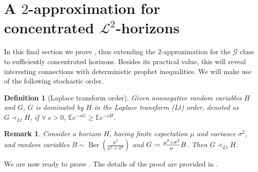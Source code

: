 \documentclass[11pt, a4paper, twoside]{article}
\newcommand*{\defeq}{\mathrel{\vcenter{\baselineskip0.5ex \lineskiplimit0pt
			\hbox{\scriptsize.}\hbox{\scriptsize.}}}=}
\newcommand{\EE}{\mathbb{E}}
\newcommand{\PGF}{\mathcal{G}}
\DeclareMathOperator{\Ber}{Ber}
\newtheorem{remark}{Remark}[section]
\newtheorem{definition}{Definition}[section]
\numberwithin{equation}{section}
\begin{document}
	\section{A $2$-approximation for concentrated $\mathcal{L}^2$-horizons}\label{L2}
	In this final section we prove , thus extending the $2$-approximation for the $\PGF$ class to sufficiently concentrated horizons. Besides its practical value, this will reveal interesting connections with deterministic prophet inequalities. We will make use of the following stochastic order.
	\begin{definition}[Laplace transform order]
		Given nonnegative random variables $H$ and $G$, $G$ is dominated by $H$ in the \emph{Laplace transform (Lt) order}, denoted as $G\prec_{Lt} H$, if $\forall\:s>0$, $\EE e^{-sG}\ge\EE e^{-sH}$.
	\end{definition}
	\begin{remark}\label{bernoulli}
		Consider a horizon $H$, having finite expectation $\mu$ and variance $\sigma^2$, and random variables $B\sim\Ber\left(\frac{\mu^2}{\mu^2+\sigma^2}\right)$ and $G\defeq\frac{\mu^2+\sigma^2}{\mu}B$. Then $G\prec_{Lt}H$.
	\end{remark}
	We are now ready to prove . The details of the proof are provided in .
\end{document}
